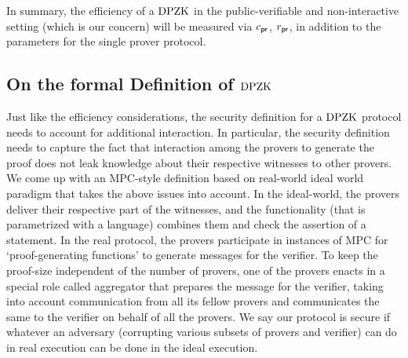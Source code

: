 


In summary, the efficiency of a $\text{DPZK}$ in the public-verifiable and
non-interactive setting (which is our concern) will be measured via $c_\mathsf{pr}$,
$r_\mathsf{pr}$, in addition to the parameters for the single prover protocol.

\subsection{On the formal Definition of $\text{DPZK}$}
Just like the efficiency considerations, the security definition for a $\text{DPZK}$ protocol needs to account for additional interaction. 
In particular, the security definition needs to capture the fact that interaction among the provers to generate the proof does not 
leak knowledge about their respective witnesses to other provers. 
We come up with an MPC-style definition based on real-world ideal world paradigm \cite{Canetti00,Goldreich2001,Lindell17,CohenL14}  
that takes the above issues into account. In the ideal-world, the provers deliver their respective part of the witnesses, 
and the functionality (that is parametrized with a language) combines them and check the assertion of a statement. 
In the real protocol, the provers participate in instances of MPC for `proof-generating functions' to generate messages for the verifier. 
To keep the proof-size independent of the number of provers, one of the provers enacts in a special role called 
aggregator that prepares the message for the verifier, taking into account communication from all its fellow provers 
and communicates the same to the verifier on behalf of all the provers. We say our protocol is secure if whatever an 
adversary (corrupting various subsets of provers and verifier) can do in real execution can be done in the ideal execution. 

